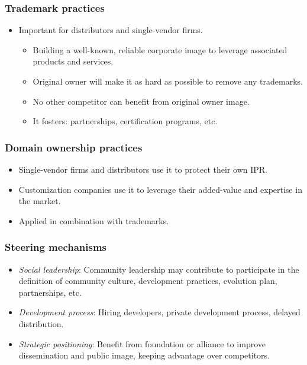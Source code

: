 
\begin{frame}
 \frametitle{Trademark practices}
\begin{itemize}
 \item Important for distributors and single-vendor firms.
 \begin{itemize}
  \item Building a well-known, reliable corporate image to leverage associated products and services.
  \item Original owner will make it as hard as possible to remove any trademarks.
  \item No other competitor can benefit from original owner image.
  \item It fosters: partnerships, certification programs, etc.
 \end{itemize}

\end{itemize}

\end{frame}


\begin{frame}
 \frametitle{Domain ownership practices}
\begin{itemize}
 \item Single-vendor firms and distributors use it to protect their own IPR.
 \item Customization companies use it to leverage their added-value and expertise in the market.
 \item Applied in combination with trademarks.
\end{itemize}

\end{frame}


\begin{frame}
 \frametitle{Steering mechanisms}
\begin{itemize}
 \item \textit{Social leadership}: Community leadership may contribute
to participate in the definition of community culture, development practices,
evolution plan, partnerships, etc.
 \item \textit{Development process}: Hiring developers, private development process,
delayed distribution.
 \item \textit{Strategic positioning}: Benefit from foundation or alliance to
improve dissemination and public image, keeping advantage over competitors.
\end{itemize}

\end{frame}

